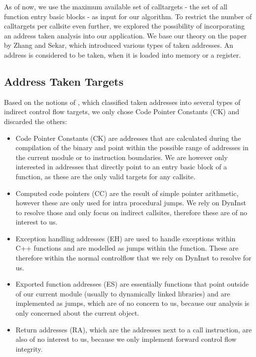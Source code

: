 As of now, we use the maximum available set of calltargets - the set of all function entry basic blocks - as input for our algorithm. To restrict the number of calltargets per callsite even further, we explored the possibility of incorporating an address taken analysis into our application. We base our theory on the paper by Zhang and Sekar\cite{mingwei:sekar}, which introduced various types of taken addresses. An address is considered to be taken, when it is loaded into memory or a register.

\subsection{Address Taken Targets}
Based on the notions of \cite{mingwei:sekar}, which classified taken addresses into several types of indirect control flow targets, we only chose { Code Pointer Constants (CK)} and discarded the others:
\begin{itemize}

\item { Code Pointer Constants (CK)} are addresses that are calculated during the compilation of the binary and point within the possible range of addresses in the current module or to instruction boundaries. We are however only interested in addresses that directly point to an entry basic block of a function, as these are the only valid targets for any callsite.

\item { Computed code pointers (CC)} are the result of simple pointer arithmetic, however these are only used for intra procedural jumps. We rely on DynInst to resolve those and only focus on indirect callsites, therefore these are of no interest to us.

\item{ Exception handling addresses (EH)} are used to handle exceptions within C++ functions and are modelled as jumps within the function. These are therefore within the normal controlflow that we rely on DynInst to resolve for us.

\item{ Exported function addresses (ES)} are essentially functions that point outside of our current module (usually to dynamically linked libraries) and are implemented as jumps, which are of no concern to us, because our analysis is only concerned about the current object.

\item { Return addresses (RA)}, which are the addresses next to a call instruction, are also of no interest to us, because we only implement forward { control flow integrity}.
\end{itemize}

